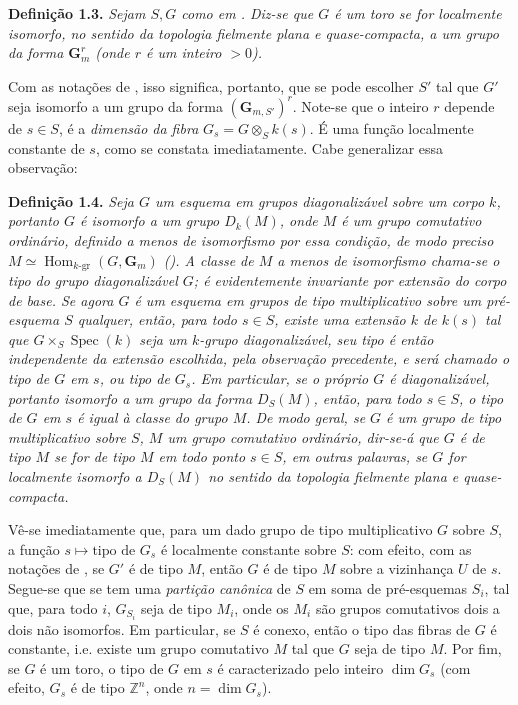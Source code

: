 \medskip
\noindent{}\textbf{Definição 1.3.}
\textit{Sejam \(S,G\) como em
. Diz-se que \(G\) é um toro se
for localmente isomorfo, no sentido da topologia fielmente plana e
quase-compacta, a um grupo da forma \(\mathbf G_m^r\) (onde \(r\) é
um inteiro \(>0\)).}

Com as notações de , isso
significa, portanto, que se pode escolher \(S'\) tal que \(G'\) seja
isomorfo a um grupo da forma \((\mathbf G_{m,S'})^r\). Note-se que
o inteiro \(r\) depende de \(s\in S\), é a \emph{dimensão da fibra}
\(G_s=G\otimes_S k(s)\). É uma função localmente constante de \(s\),
como se constata imediatamente. Cabe generalizar essa observação:

\medskip
\noindent{}\textbf{Definição 1.4.}
\textit{Seja \(G\) um esquema em grupos diagonalizável sobre um corpo
\(k\), portanto \(G\) é isomorfo a um grupo \(D_k(M)\), onde \(M\)
é um grupo comutativo ordinário, definido a menos de isomorfismo por
essa condição, de modo preciso
\(M\simeq\operatorname{Hom}_{k\text{-}\mathrm{gr}}(G,\mathbf G_m)\)
(). A classe de \(M\)
a menos de isomorfismo chama-se o tipo do grupo diagonalizável \(G\);
é evidentemente invariante por extensão do corpo de base. Se agora
\(G\) é um esquema em grupos de tipo multiplicativo sobre um
pré-esquema \(S\) qualquer, então, para todo \(s\in S\), existe uma
extensão \(k\) de \(k(s)\) tal que \(G\times_S\operatorname{Spec}(k)\)
seja um \(k\)-grupo diagonalizável, seu tipo é então independente da
extensão escolhida, pela observação precedente, e será chamado o tipo
de \(G\) em \(s\), ou tipo de \(G_s\). Em particular, se o próprio
\(G\) é diagonalizável, portanto isomorfo a um grupo da forma
\(D_S(M)\), então, para todo \(s\in S\), o tipo de \(G\) em \(s\)
é igual à classe do grupo \(M\). De modo geral, se \(G\) é um grupo
de tipo multiplicativo sobre \(S\), \(M\) um grupo comutativo
ordinário, dir-se-á que \(G\) é de tipo \(M\) se for de tipo \(M\)
em todo ponto \(s\in S\), em outras palavras, se \(G\) for localmente
isomorfo a \(D_S(M)\) no sentido da topologia fielmente plana e
quase-compacta.}

Vê-se imediatamente que, para um dado grupo de tipo multiplicativo
\(G\) sobre \(S\), a função \(s\mapsto\text{tipo de }G_s\) é
localmente constante sobre \(S\): com efeito, com as notações de
, se \(G'\) é de tipo \(M\),
então \(G\) é de tipo \(M\) sobre a vizinhança \(U\) de \(s\).
Segue-se que se tem uma \emph{partição canônica} de \(S\) em soma de
pré-esquemas \(S_i\), tal que, para todo \(i\), \(G_{S_i}\) seja de
tipo \(M_i\), onde os \(M_i\) são grupos comutativos dois a dois não
isomorfos. Em particular,
se \(S\) é conexo, então o tipo das fibras de \(G\) é constante,
i.e. existe um grupo comutativo \(M\) tal que \(G\) seja de tipo
\(M\). Por fim, se \(G\) é um toro, o tipo de \(G\) em \(s\) é
caracterizado pelo inteiro \(\dim G_s\) (com efeito, \(G_s\) é de
tipo \(\mathbb Z^n\), onde \(n=\dim G_s\)).

